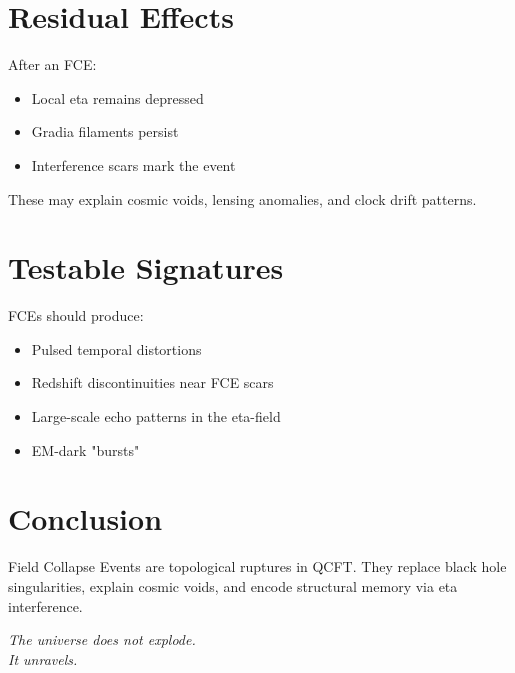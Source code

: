 \documentclass[12pt]{article}
\begin{document}
\section{Residual Effects}

After an FCE:

\begin{itemize}
\item Local eta remains depressed
\item Gradia filaments persist
\item Interference scars mark the event
\end{itemize}

These may explain cosmic voids, lensing anomalies, and clock drift patterns.

\section{Testable Signatures}

FCEs should produce:

\begin{itemize}
\item Pulsed temporal distortions
\item Redshift discontinuities near FCE scars
\item Large-scale echo patterns in the eta-field
\item EM-dark "bursts"
\end{itemize}

\section*{Conclusion}

Field Collapse Events are topological ruptures in QCFT. They replace black hole singularities, explain cosmic voids, and encode structural memory via eta interference.

\begin{center}
\textit{The universe does not explode.\\It unravels.}
\end{center}
\end{document}
